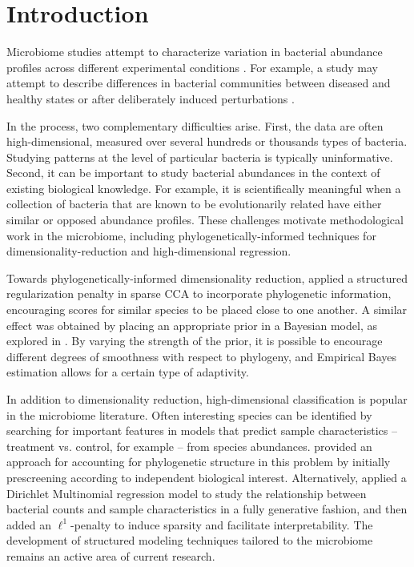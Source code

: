 \documentclass[oupdraft]{bio}
\begin{document}
\section{Introduction}

Microbiome studies attempt to characterize variation in bacterial abundance
profiles across different experimental conditions \citep{gilbert2014earth}. For
example, a study may attempt to describe differences in bacterial communities
between diseased and healthy states or after deliberately induced perturbations
\citep{dethlefsen2011incomplete, fukuyama2017multidomain}.

In the process, two complementary difficulties arise. First, the data are often
high-dimensional, measured over several hundreds or thousands types of bacteria.
Studying patterns at the level of particular bacteria is typically
uninformative. Second, it can be important to study bacterial abundances in the
context of existing biological knowledge. For example, it is scientifically
meaningful when a collection of bacteria that are known to be evolutionarily
related have either similar or opposed abundance profiles. These challenges
motivate methodological work in the microbiome, including
phylogenetically-informed techniques for dimensionality-reduction and
high-dimensional regression.

Towards phylogenetically-informed dimensionality reduction,
\cite{chen2013structure} applied a structured regularization penalty in sparse
CCA to incorporate phylogenetic information, encouraging scores for similar
species to be placed close to one another. A similar effect was obtained by
placing an appropriate prior in a Bayesian model, as explored in
\cite{fukuyama2017adaptive}. By varying the strength of the prior, it is
possible to encourage different degrees of smoothness with respect to phylogeny,
and Empirical Bayes estimation allows for a certain type of adaptivity.

In addition to dimensionality reduction, high-dimensional classification is
popular in the microbiome literature. Often interesting species can be
identified by searching for important features in models that predict sample
characteristics -- treatment vs. control, for example -- from species
abundances. \cite{segata2011metagenomic} provided an approach for accounting for
phylogenetic structure in this problem by initially prescreening according to
independent biological interest. Alternatively, \cite{chen2013variable} applied
a Dirichlet Multinomial regression model to study the relationship between
bacterial counts and sample characteristics in a fully generative fashion, and
then added an $\ell^{1}$-penalty to induce sparsity and facilitate
interpretability. The development of structured modeling techniques tailored to
the microbiome remains an active area of current research.
\end{document}

